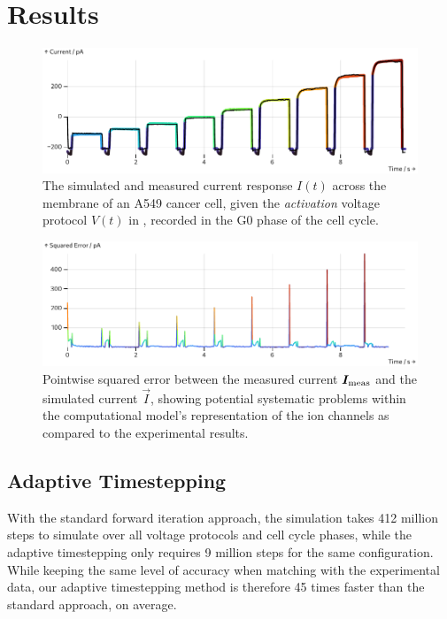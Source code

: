 \section{Results}
\begin{figure}[ht]
  \includegraphics[width=\columnwidth]{../figures/results/full-simulation-current.pdf}
  \caption{The simulated and measured current response $I(t)$ across the membrane of an A549 cancer cell, given the \textit{activation} voltage protocol $V(t)$ in , recorded in the G0 phase of the cell cycle.}
  \label{figure:full-simulation-current}
\end{figure}
\begin{figure}
  \includegraphics[width=\columnwidth]{../figures/results/simulation-error.pdf}
  \caption{Pointwise squared error between the measured current $\vec{I}_{\rm meas}$ and the simulated current $\vec{I}$, showing potential systematic problems within the computational model's representation of the ion channels as compared to the experimental results.}
  \label{figure:simulation-error}
\end{figure}

\subsection{Adaptive Timestepping}
With the standard forward iteration approach, the simulation takes 412 million steps to simulate over all voltage protocols and cell cycle phases, while the adaptive timestepping only requires 9 million steps for the same configuration.
While keeping the same level of accuracy when matching with the experimental data, our adaptive timestepping method is therefore 45 times faster than the standard approach, on average.


